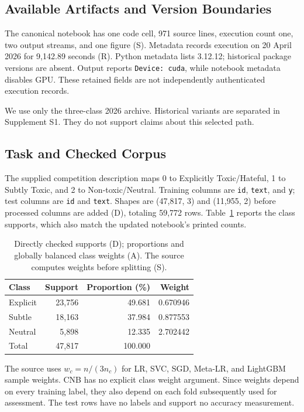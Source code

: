 \documentclass[doublecolumn]{ijcvsplatex}
\begin{document}
\subsection{Available Artifacts and Version Boundaries}
The canonical notebook has one code cell, 971 source lines, execution count one, two output streams, and one figure (S). Metadata records execution on 20 April 2026 for 9,142.89 seconds (R). Python metadata lists 3.12.12; historical package versions are absent. Output reports \texttt{Device: cuda}, while notebook metadata disables GPU. These retained fields are not independently authenticated execution records.

We use only the three-class 2026 archive. Historical variants are separated in Supplement S1. They do not support claims about this selected path.

\subsection{Task and Checked Corpus}
The supplied competition description maps 0 to Explicitly Toxic/Hateful, 1 to Subtly Toxic, and 2 to Non-toxic/Neutral. Training columns are \texttt{id}, \texttt{text}, and \texttt{y}; test columns are \texttt{id} and \texttt{text}. Shapes are (47,817, 3) and (11,955, 2) before processed columns are added (D), totaling 59,772 rows. Table~\ref{tab:supports} reports the class supports, which also match the updated notebook's printed counts.

\begin{table}[t]
\small\centering
\caption{Directly checked supports (D); proportions and globally balanced class weights (A). The source computes weights before splitting (S).}
\label{tab:supports}
\begin{tabular}{lrrr}
\toprule
Class & Support & Proportion (\%) & Weight \\
\midrule
Explicit & 23,756 & 49.681 & 0.670946 \\
Subtle & 18,163 & 37.984 & 0.877553 \\
Neutral & 5,898 & 12.335 & 2.702442 \\
\midrule
Total & 47,817 & 100.000 & \\
\bottomrule
\end{tabular}
\end{table}

The source uses $w_c=n/(3n_c)$ for LR, SVC, SGD, Meta-LR, and LightGBM sample weights. CNB has no explicit class weight argument. Since weights depend on every training label, they also depend on each fold subsequently used for assessment. The test rows have no labels and support no accuracy measurement.
\end{document}
